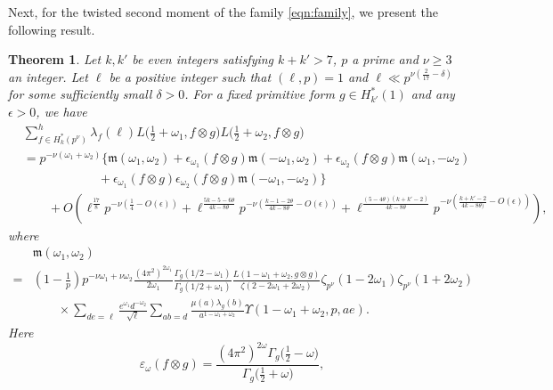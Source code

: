 \documentclass[12pt]{amsart}
\theoremstyle{plain}
\newtheorem{thm}{Theorem}[section]
\theoremstyle{definition}
\begin{document}
Next, for the twisted second moment of the family \eqref{eqn:family}, we present the following result. 


\begin{thm}\label{thm:2nd moment}
Let $k, k'$ be even integers satisfying $k+k' >7$, $p$ a prime and $\nu\geq 3$ an integer. Let  $\ell$ be a positive integer such that $(\ell, p)=1$ and $\ell \ll p^{\nu(\frac{2}{17}-\delta)}$ for some sufficiently small $\delta>0$. For a fixed primitive form $g \in H^*_{k'}(1)$ and any $\epsilon>0$, we have
    \begin{align*}
     &\sum^h_{f\in H^*_k(p^\nu)} 
     \lambda_f(\ell) L\Big( \frac12+\omega_1, f\otimes g\Big) 
     L\Big(\frac12+\omega_2, f\otimes g\Big)
    \\
   & =     p^{-\nu(\omega_1+\omega_2)} 
   \Big\{ \mathfrak{m}(\omega_1, \omega_2 ) 
   + \epsilon_{\omega_1}(f\otimes g) \mathfrak{m}(-\omega_1, \omega_2 ) 
   +\epsilon_{\omega_2}(f\otimes g) \mathfrak{m}(\omega_1, -\omega_2 ) 
   \\
   &\qquad \qquad \qquad+\epsilon_{\omega_1}(f\otimes g)\epsilon_{\omega_2}(f\otimes g)
    \mathfrak{m}(-\omega_1, -\omega_2 ) 
   \Big\} \\&\hspace{2em} + O\left(\ell^{\frac{17}{8}}p^{-\nu\left(\frac14-O(\epsilon)\right)}
+\ell^{\frac{5k-5-6\theta}{4k-8\theta}}
p^{-\nu\left(\frac{k-1-2\theta}{4k-8\theta}-O(\epsilon)\right)} +\ell^{\frac{(5-4\theta)(k+k'-2)}{4k-8\theta}}
p^{-\nu\left(\frac{k+k'-2}{4k-8\theta)}-O(\epsilon)\right)}\right)
,
    \end{align*}
where
       \begin{align*}
    &\mathfrak{m}(\omega_1, \omega_2 )
    \\
    =&  \left(1-\frac{1}{p}\right)p^{-\nu\omega_1+\nu\omega_2}\frac{(4\pi^2)^{2\omega_1} }{2\omega_1}  \frac{\Gamma_g(1/2-\omega_1) }{\Gamma_g(1/2+\omega_1)}\frac{L(1-\omega_1+\omega_2, g\otimes g)}{\zeta(2-2\omega_1+2\omega_2)}
    \zeta_{p^\nu}(1-2\omega_1)\zeta_{p^\nu}(1+2\omega_2)\\&\hspace{2em}\times \sum_{de=\ell} 
        \frac{ e^{\omega_1} d^{-\omega_2}}{\sqrt{\ell}}
      \sum_{ab=d} \frac{\mu(a)  \lambda_g(b)}{a^{1-\omega_1+\omega_2} } 
      \Upsilon(1-\omega_1+\omega_2, p, ae) .
    \end{align*}
Here   
\[
    \varepsilon_{\omega}(f \otimes g)
    = \frac{(4\pi^2)^{2\omega}\Gamma_g\big(\frac12-\omega\big)}{\Gamma_g\big(\frac12+\omega\big)},
\]
\end{thm}
\end{document}
